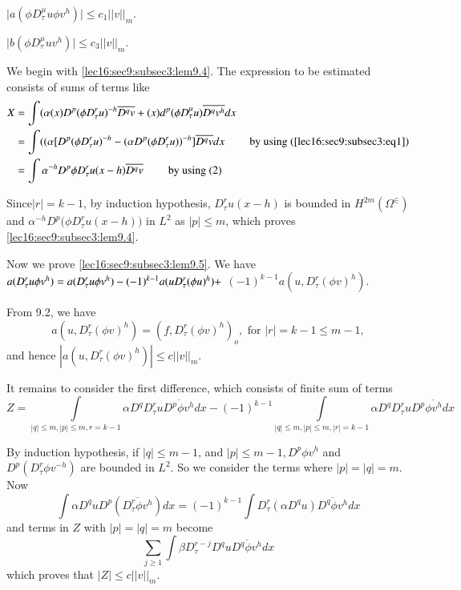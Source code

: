 \begin{lemma}\label{lec16:sec9:subsec3:lem9.5} %
  $\big|a(\phi D^{\mu}_{\tau} u \phi v^h)| \leq c_1 ||v||_m $.
\end{lemma}

\begin{lemma}\label{lec16:sec9:subsec3:lem9.6} %
  $\big|b(\phi D^{\mu}_{\tau} u v^{h})\big| \leq c_3 ||v||_m$. 
\end{lemma}

We begin with \ref{lec16:sec9:subsec3:lem9.4}. The expression to be estimated consists of sums
of terms like  
\begin{align*}
  X & = \int (\alpha (x)D^p(\phi D^r_{\tau} u )^{-h} \overline{D^q v}+ (x)
  d^p(\phi D^\mu_{\tau} u )\overline{D^q v^h} dx\\ 
  & = \int ( (\alpha[D^p(\phi D^r_{\tau} u )^{-h} - (\alpha D^p(\phi
    D^r_{\tau} u ))^{-h}] \overline{D^q v} dx \tag*{ by using (\ref{lec16:sec9:subsec3:eq1})} \\
  & = \int \alpha^{-h} D^p \phi D^r_{\tau} u (x-h) \overline{D^q v}
  \tag*{ by using (2)}  
\end{align*}

Since\pageoriginale $|r|= k-1$, by induction hypothesis, $D^r_{\tau} u(x-h)$ is
bounded in $H^{2m}(\Omega^{\in})$ and $\alpha^{-h} D^p ( \phi
D^r_{\tau} u (x-h) \bigg )$ in $L^2$ as $|p| \leq m$, which proves
\ref{lec16:sec9:subsec3:lem9.4}.  

Now we prove \ref{lec16:sec9:subsec3:lem9.5}. We have $a(D^r_{\tau} u \phi v^h) = a(D^r_{\tau}
u \phi v^h) -(-1)^{k-1} a(u\break D^r_{\tau} (\phi u)^h) +$ $ (-1)^{k-1}
a(u, D^r_{\tau} (\phi v)^h)$.  

From 9.2, we have
 $$
 a(u, D^r_{\tau}(\phi v)^h) = (f, D^r_{\tau} (\phi v)^h)_o, \text{ for
 }|r|= k-1 \leq m-1,  
 $$
 and hence $| a(u, D^r_{\tau} (\phi v)^h)|\leq c||v||_m$. 
 
It remains to consider the first difference, which consists of finite
sum of terms  
$$
Z = \int\limits_{|q| \leq m, |p| \leq m, r= k-1} \alpha D^q
    D^r_{\tau} u \overline{D^p \phi v^h} dx- (-1)^{k-1} \int\limits_{
    |q| \leq m, |p| \leq m, |r|= k-1}\alpha D^q D^r_{\tau} u
    \overline{D^p\phi v^h dx} 
$$

By induction hypothesis, if $|q| \leq m-1$, and $|p| \leq m-1, D^p
\phi v^h$ and $D^p( D^r_{\tau} \phi v^{-h})$ are bounded in $L^2$. So
we consider the terms where $|p|=|q| =m$. Now 
$$
\int \alpha D^q u D^p (\overline{D^r_{\tau} \phi v^h}) dx = (-1)^{k-1} \int
D^r_{\tau}(\alpha D^q u) \overline{ D^q \phi v^h}dx 
$$
and terms in $Z$ with $|p| = |q|= m$ become
$$
\sum_{j \geq 1} \int \beta D^{r-j}_{\tau} D^q u \overline{ D^q \phi v^h}dx
$$
which proves that $|Z| \leq c||v||_m$. 

